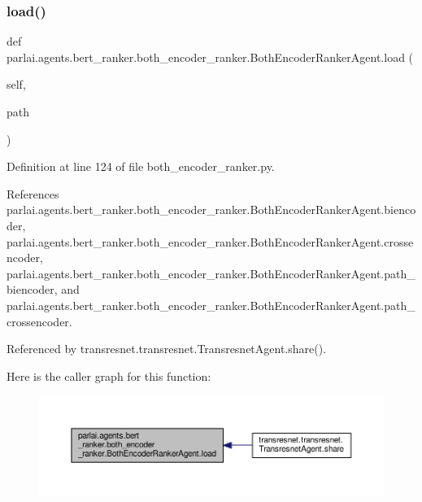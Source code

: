 \subsubsection{\texorpdfstring{load()}{load()}}
{\footnotesize\ttfamily def parlai.\+agents.\+bert\+\_\+ranker.\+both\+\_\+encoder\+\_\+ranker.\+Both\+Encoder\+Ranker\+Agent.\+load (\begin{DoxyParamCaption}\item[{}]{self,  }\item[{}]{path }\end{DoxyParamCaption})}



Definition at line 124 of file both\+\_\+encoder\+\_\+ranker.\+py.



References parlai.\+agents.\+bert\+\_\+ranker.\+both\+\_\+encoder\+\_\+ranker.\+Both\+Encoder\+Ranker\+Agent.\+biencoder, parlai.\+agents.\+bert\+\_\+ranker.\+both\+\_\+encoder\+\_\+ranker.\+Both\+Encoder\+Ranker\+Agent.\+crossencoder, parlai.\+agents.\+bert\+\_\+ranker.\+both\+\_\+encoder\+\_\+ranker.\+Both\+Encoder\+Ranker\+Agent.\+path\+\_\+biencoder, and parlai.\+agents.\+bert\+\_\+ranker.\+both\+\_\+encoder\+\_\+ranker.\+Both\+Encoder\+Ranker\+Agent.\+path\+\_\+crossencoder.



Referenced by transresnet.\+transresnet.\+Transresnet\+Agent.\+share().

Here is the caller graph for this function\+:
\nopagebreak
\begin{figure}[H]
\begin{center}
\leavevmode
\includegraphics[width=350pt]{classparlai_1_1agents_1_1bert__ranker_1_1both__encoder__ranker_1_1BothEncoderRankerAgent_a3900966ef98a770cf6e871bb7de67907_icgraph}
\end{center}
\end{figure}
\mbox{\label{classparlai_1_1agents_1_1bert__ranker_1_1both__encoder__ranker_1_1BothEncoderRankerAgent_a5e8419dfd48e5a9b0a999058a9537831}} 
